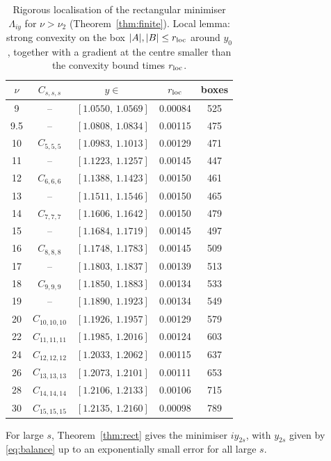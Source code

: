 \documentclass[10pt,twocolumn,a4paper]{article}
\theoremstyle{definition}
\begin{document}
\begin{table}[t]
\caption{Rigorous localisation of the rectangular minimiser $\Lambda_{iy}$ for $\nu>\nu_2$ (Theorem~\ref{thm:finite}). Local lemma: strong convexity on the box $|A|,|B|\le r_{\rm loc}$ around $y_0$, together with a gradient at the centre smaller than the convexity bound times $r_{\rm loc}$.}
\label{tab:rect}\centering\footnotesize
\setlength{\tabcolsep}{3.5pt}
\begin{tabular}{@{}ccccc@{}}\toprule
$\nu$ & $C_{s,s,s}$ & $y\in$ & $r_{\rm loc}$ & boxes\\\midrule
9 & -- & $[1.0550,\,1.0569]$ & 0.00084 & 525\\
9.5 & -- & $[1.0808,\,1.0834]$ & 0.00115 & 475\\
10 & $C_{5,5,5}$ & $[1.0983,\,1.1013]$ & 0.00129 & 471\\
11 & -- & $[1.1223,\,1.1257]$ & 0.00145 & 447\\
12 & $C_{6,6,6}$ & $[1.1388,\,1.1423]$ & 0.00150 & 461\\
13 & -- & $[1.1511,\,1.1546]$ & 0.00150 & 465\\
14 & $C_{7,7,7}$ & $[1.1606,\,1.1642]$ & 0.00150 & 479\\
15 & -- & $[1.1684,\,1.1719]$ & 0.00145 & 497\\
16 & $C_{8,8,8}$ & $[1.1748,\,1.1783]$ & 0.00145 & 509\\
17 & -- & $[1.1803,\,1.1837]$ & 0.00139 & 513\\
18 & $C_{9,9,9}$ & $[1.1850,\,1.1883]$ & 0.00134 & 533\\
19 & -- & $[1.1890,\,1.1923]$ & 0.00134 & 549\\
20 & $C_{10,10,10}$ & $[1.1926,\,1.1957]$ & 0.00129 & 579\\
22 & $C_{11,11,11}$ & $[1.1985,\,1.2016]$ & 0.00124 & 603\\
24 & $C_{12,12,12}$ & $[1.2033,\,1.2062]$ & 0.00115 & 637\\
26 & $C_{13,13,13}$ & $[1.2073,\,1.2101]$ & 0.00111 & 653\\
28 & $C_{14,14,14}$ & $[1.2106,\,1.2133]$ & 0.00106 & 715\\
30 & $C_{15,15,15}$ & $[1.2135,\,1.2160]$ & 0.00098 & 789\\
\bottomrule
\end{tabular}
\end{table}
For large $s$, Theorem~\ref{thm:rect} gives the minimiser $iy_{2s}$, with $y_{2s}$ given by \eqref{eq:balance} up to an exponentially small error for all large $s$.
\end{document}
